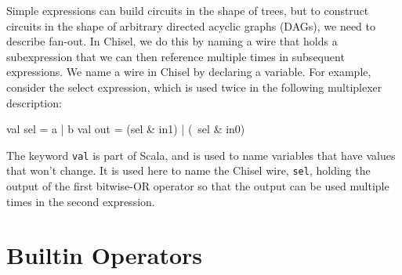 \documentclass[10pt]{article}
\def\code#1{{\tt #1}}
\begin{document}
Simple expressions can build circuits in the shape of trees, but to
construct circuits in the shape of arbitrary directed acyclic graphs
(DAGs), we need to describe fan-out.  In Chisel, we do this by naming
a wire that holds a subexpression that we can then reference multiple
times in subsequent expressions.  We name a wire in Chisel by
declaring a variable.  For example, consider the select expression,
which is used twice in the following multiplexer description:
\begin{scala}
val sel = a | b
val out = (sel & in1) | (~sel & in0)
\end{scala}

\noindent
The keyword \code{val} is part of Scala, and is used to name variables
that have values that won't change.  It is used here to name the
Chisel wire, \code{sel}, holding the output of the first bitwise-OR
operator so that the output can be used multiple times in the second
expression.

\section{Builtin Operators}
\end{document}
